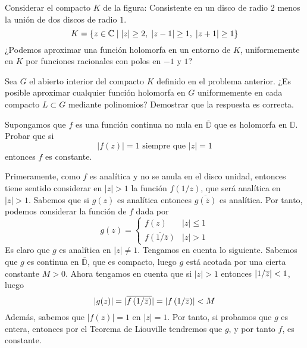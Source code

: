 \documentclass[twoside]{article}
\begin{document}
\begin{ejercicio}{7}
Considerar el compacto $K$ de la figura: Consistente en un disco de radio $2$ menos la unión de dos discos de radio $1$.
$$
K=\{z\in \mathbb{C}\mid |z|\geq 2, \; |z-1|\geq 1,\; |z+1|\geq 1\}
$$
¿Podemos aproximar una función holomorfa en un entorno de $K$, uniformemente en $K$ por funciones racionales con polos en $-1$ y $1$?
\end{ejercicio}
\begin{solucion}

\end{solucion}
\newpage


\begin{ejercicio}{8}
Sea $G$ el abierto interior del compacto $K$ definido en el problema anterior. ¿Es posible aproximar cualquier función holomorfa en $G$ uniformemente en cada compacto $L\subset G$ mediante polinomios? Demostrar que la respuesta es correcta.
\end{ejercicio}
\begin{solucion}
\end{solucion}
\newpage


\begin{ejercicio}{9}
Supongamos que $f$ es una función continua no nula en $\overline{\mathbb{D}}$ que es holomorfa en $\mathbb{D}$. Probar que si 
$$
|f(z)|=1 \text{ siempre que } |z|=1
$$
entonces $f$ es constante.
\end{ejercicio}
\begin{solucion}
Primeramente, como $f$ es analítica y no se anula en el disco unidad, entonces tiene sentido considerar en $|z|>1$ la función $f(1/z)$, que será analítica en $|z|>1$. Sabemos que si $g(z)$ es analítica entonces $\overline{g(\overline{z})}$ es analítica.  Por tanto, podemos considerar la función de $f$ dada por 
$$
g(z)=
\begin{cases}
f(z) & |z|\leq 1\\
\overline{f\left({1}/{\overline{z}}\right)} & |z|>1
\end{cases}
$$
Es claro que $g$ es analítica en $|z|\neq 1$. Tengamos en cuenta lo siguiente. Sabemos que $g$ es continua en $\overline{\mathbb{D}}$, que es compacto, luego $g$ está acotada por una cierta constante $M>0$. Ahora tengamos en cuenta que si $|z|>1$ entonces $\left\lvert1/\overline{z}\right\rvert<1$, luego 
$$|g(z)| = |\overline{f\left({1}/{\overline{z}}\right)}| = \left\lvert f\left({1}/{\overline{z}}\right)\right\rvert<M
$$
Además, sabemos que $|f(z)|=1$ en $|z|=1$. Por tanto, si probamos que $g$ es entera, entonces por el Teorema de Liouville tendremos que $g$, y por tanto $f$, es constante.
\end{solucion}
\newpage
\end{document}
